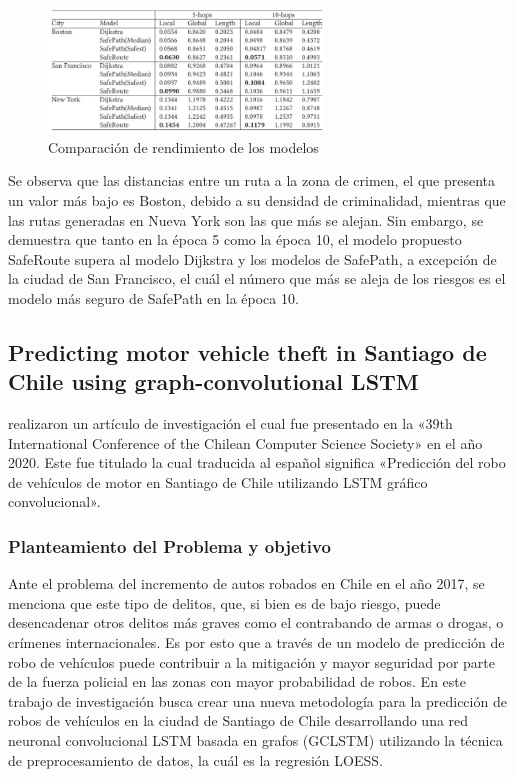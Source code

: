 \begin{figure}[h]
	\begin{center}
		\includegraphics[width=0.65\textwidth]{2/figures/resultSafe.jpg}
		\caption{Comparación de rendimiento de los modelos}
		\label{1:fig2}
	\end{center}
\end{figure}

Se observa que las distancias entre un ruta a la zona de crimen, el que presenta un valor más bajo es Boston, debido a su densidad de criminalidad, mientras que las rutas generadas en Nueva York son las que más se alejan. Sin embargo, se demuestra que tanto en la época 5 como la época 10, el modelo propuesto SafeRoute supera al modelo Dijkstra y los modelos de SafePath, a excepción de la ciudad de San Francisco, el cuál el número que más se aleja de los riesgos es el modelo más seguro de SafePath en la época 10.

\subsection{Predicting motor vehicle theft in Santiago de Chile using graph-convolutional LSTM \citep*{pr_dehghani2018copper}}
\citeauthor{pr_dehghani2018copper} realizaron un artículo de investigación el cual fue presentado en la «39th International Conference of the Chilean Computer Science Society» en el año 2020. Este fue titulado  la cual traducida al español significa «Predicción del robo de vehículos de motor en Santiago de Chile utilizando LSTM gráfico convolucional».

\subsubsection{Planteamiento del Problema y objetivo }
Ante el problema del incremento de autos robados en Chile en el año 2017, se menciona que este tipo de delitos, que, si bien es de bajo riesgo, puede desencadenar otros delitos más graves como el contrabando de armas o drogas, o crímenes internacionales. Es por esto que a través de un modelo de predicción de robo de vehículos puede contribuir a la mitigación y mayor seguridad por parte de la fuerza policial en las zonas con mayor probabilidad de robos. En este trabajo de investigación busca crear una nueva metodología para la predicción de robos de vehículos en la ciudad de Santiago de Chile desarrollando una red neuronal convolucional LSTM basada en grafos (GCLSTM) utilizando la técnica de preprocesamiento de datos, la cuál es la regresión LOESS.


